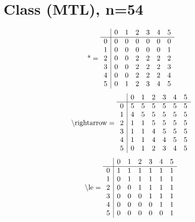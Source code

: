 \documentclass[11pt]{article}
\begin{document}
\section{Class (MTL), n=54}
\[\text{*} = 
\begin{array}{r | r r r r r r}
 & 0 & 1 & 2 & 3 & 4 & 5 \\ \hline
0 & 0 & 0 & 0 & 0 & 0 & 0 \\
1 & 0 & 0 & 0 & 0 & 0 & 1 \\
2 & 0 & 0 & 2 & 2 & 2 & 2 \\
3 & 0 & 0 & 2 & 2 & 2 & 3 \\
4 & 0 & 0 & 2 & 2 & 2 & 4 \\
5 & 0 & 1 & 2 & 3 & 4 & 5 \\
\end{array}
\]
\[\text{\textbackslash rightarrow} = 
\begin{array}{r | r r r r r r}
 & 0 & 1 & 2 & 3 & 4 & 5 \\ \hline
0 & 5 & 5 & 5 & 5 & 5 & 5 \\
1 & 4 & 5 & 5 & 5 & 5 & 5 \\
2 & 1 & 1 & 5 & 5 & 5 & 5 \\
3 & 1 & 1 & 4 & 5 & 5 & 5 \\
4 & 1 & 1 & 4 & 4 & 5 & 5 \\
5 & 0 & 1 & 2 & 3 & 4 & 5 \\
\end{array}
\]
\[\text{\textbackslash le} = 
\begin{array}{r | r r r r r r}
 & 0 & 1 & 2 & 3 & 4 & 5 \\ \hline
0 & 1 & 1 & 1 & 1 & 1 & 1 \\
1 & 0 & 1 & 1 & 1 & 1 & 1 \\
2 & 0 & 0 & 1 & 1 & 1 & 1 \\
3 & 0 & 0 & 0 & 1 & 1 & 1 \\
4 & 0 & 0 & 0 & 0 & 1 & 1 \\
5 & 0 & 0 & 0 & 0 & 0 & 1 \\
\end{array}
\]
\end{document}
